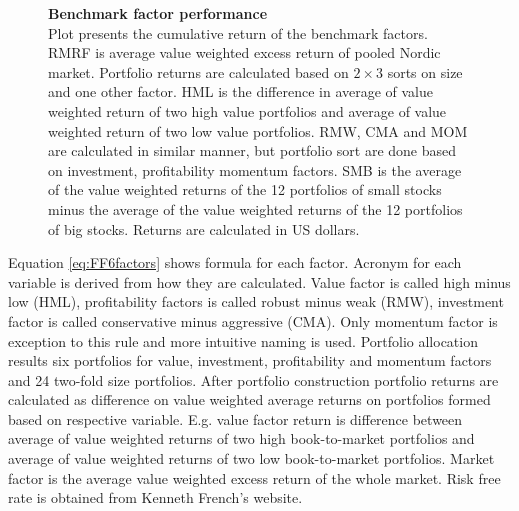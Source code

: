 \documentclass{article}
\begin{document}
\begin{figure}[h]
\centering
\caption[Benchmark factor performance]{\textbf{Benchmark factor performance}\\ Plot presents the cumulative return of the benchmark factors. RMRF is average value weighted excess return of pooled Nordic market. Portfolio returns are calculated based on $2 \times 3$ sorts on size and one other factor. HML is the difference in average of value weighted return of two high value portfolios and average of value weighted return of two low value portfolios. RMW, CMA and MOM are calculated in similar manner, but portfolio sort are done based on investment, profitability momentum factors. SMB is the average of the value weighted returns of the 12 portfolios of small stocks minus the average of the value weighted returns of the 12 portfolios of big stocks. Returns are calculated in US dollars.}

\label{plot:factor_performance}
\end{figure}

Equation \ref{eq:FF6factors} shows formula for each factor. Acronym for each variable is derived from how they are calculated. Value factor is called high minus low (HML), profitability factors is called robust minus weak (RMW), investment factor is called conservative minus aggressive (CMA). Only momentum factor is exception to this rule and more intuitive naming is used. Portfolio allocation results six portfolios for value, investment, profitability and momentum factors and 24 two-fold size portfolios. After portfolio construction portfolio returns are calculated as difference on value weighted average returns on portfolios formed based on respective variable. E.g. value factor return is difference between average of value weighted returns of two high book-to-market portfolios and average of value weighted returns of two low book-to-market portfolios. Market factor is the average value weighted excess return of the whole market. Risk free rate is obtained from Kenneth French's website.
\end{document}
